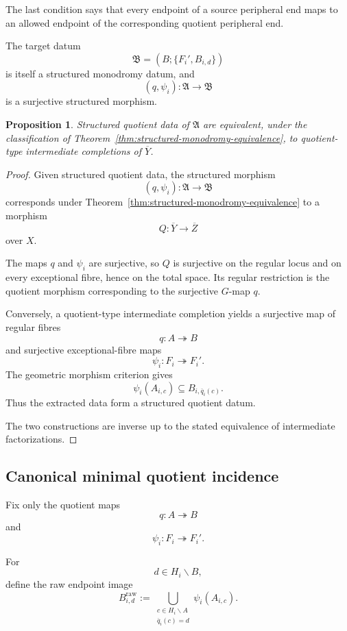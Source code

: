 \documentclass[11pt]{article}
\theoremstyle{plain}
\newtheorem{proposition}[theorem]{Proposition}
\theoremstyle{definition}
\begin{document}
The last condition says that every endpoint of a source peripheral end
maps to an allowed endpoint of the corresponding quotient peripheral
end.

The target datum
\[
\mathfrak B
=
\left(
B;\{F_i',B_{i,d}\}
\right)
\]
is itself a structured monodromy datum, and
\[
(q,\psi_i):
\mathfrak A\to\mathfrak B
\]
is a surjective structured morphism.

\begin{proposition}
\label{prop:structured-quotient-geometry}
Structured quotient data of $\mathfrak A$ are equivalent, under the
classification of
Theorem~\ref{thm:structured-monodromy-equivalence}, to quotient-type
intermediate completions of $\overline Y$.
\end{proposition}

\begin{proof}
Given structured quotient data, the structured morphism
\[
(q,\psi_i):
\mathfrak A\to\mathfrak B
\]
corresponds under
Theorem~\ref{thm:structured-monodromy-equivalence}
to a morphism
\[
Q:\overline Y\to\overline Z
\]
over $X$.

The maps $q$ and $\psi_i$ are surjective, so $Q$ is surjective on the
regular locus and on every exceptional fibre, hence on the total space.
Its regular restriction is the quotient morphism corresponding to the
surjective $G$-map $q$.

Conversely, a quotient-type intermediate completion yields a surjective
map of regular fibres
\[
q:A\twoheadrightarrow B
\]
and surjective exceptional-fibre maps
\[
\psi_i:F_i\twoheadrightarrow F_i'.
\]
The geometric morphism criterion gives
\[
\psi_i(A_{i,c})
\subseteq
B_{i,\overline q_i(c)}.
\]
Thus the extracted data form a structured quotient datum.

The two constructions are inverse up to the stated equivalence of
intermediate factorizations.
\end{proof}


\subsection{Canonical minimal quotient incidence}
\label{subsec:minimal-quotient-incidence}

Fix only the quotient maps
\[
q:A\twoheadrightarrow B
\]
and
\[
\psi_i:F_i\twoheadrightarrow F_i'.
\]


For
\[
d\in H_i\backslash B,
\]
define the raw endpoint image
\[
B_{i,d}^{\mathrm{raw}}
:=
\bigcup_{\substack{c\in H_i\backslash A\\
\overline q_i(c)=d}}
\psi_i(A_{i,c}).
\]
\end{document}
